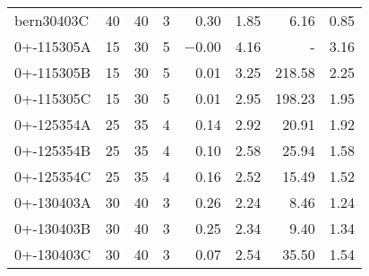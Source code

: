 \begin{scriptsize}
\begin{xtabular*}{\linewidth}{@{\extracolsep{\fill}}lrrrrrrr@{}}
bern30403C & \num{40} & \num{40} & \num{3} & \num{0.30} & \num{1.85} & \num{6.16} & \num{0.85} \\ 
0+-115305A & \num{15} & \num{30} & \num{5} & \num{-0.00} & \num{4.16} & - & \num{3.16} \\ 
0+-115305B & \num{15} & \num{30} & \num{5} & \num{0.01} & \num{3.25} & \num{218.58} & \num{2.25} \\ 
0+-115305C & \num{15} & \num{30} & \num{5} & \num{0.01} & \num{2.95} & \num{198.23} & \num{1.95} \\ 
0+-125354A & \num{25} & \num{35} & \num{4} & \num{0.14} & \num{2.92} & \num{20.91} & \num{1.92} \\ 
0+-125354B & \num{25} & \num{35} & \num{4} & \num{0.10} & \num{2.58} & \num{25.94} & \num{1.58} \\ 
0+-125354C & \num{25} & \num{35} & \num{4} & \num{0.16} & \num{2.52} & \num{15.49} & \num{1.52} \\ 
0+-130403A & \num{30} & \num{40} & \num{3} & \num{0.26} & \num{2.24} & \num{8.46} & \num{1.24} \\ 
0+-130403B & \num{30} & \num{40} & \num{3} & \num{0.25} & \num{2.34} & \num{9.40} & \num{1.34} \\ 
0+-130403C & \num{30} & \num{40} & \num{3} & \num{0.07} & \num{2.54} & \num{35.50} & \num{1.54} \\ 
\end{xtabular*} 
 \end{scriptsize} 